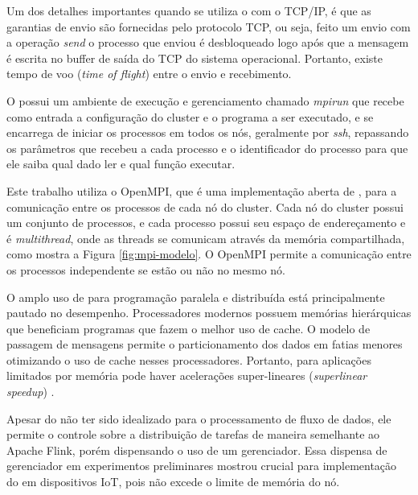 Um dos detalhes importantes quando se utiliza o \mpi com o TCP/IP, é que as
garantias de envio são fornecidas pelo protocolo TCP, ou seja, feito um envio
com a operação \emph{send} o processo que enviou é desbloqueado logo após que a
mensagem é escrita no buffer de saída do TCP do sistema operacional. Portanto,
existe tempo de voo (\emph{time of flight}) entre o envio e recebimento.

O \mpi possui um ambiente de execução e gerenciamento chamado \emph{mpirun} que
recebe como entrada a configuração do cluster e o programa a ser executado, e se
encarrega de iniciar os processos em todos os nós, geralmente por \emph{ssh},
repassando os parâmetros que recebeu a cada processo e o identificador do
processo para que ele saiba qual dado ler e qual função executar.

Este trabalho utiliza o OpenMPI, que é uma implementação aberta de \mpi, para a
comunicação entre os processos de cada nó do cluster. Cada nó do cluster possui um
conjunto de processos, e cada processo possui seu espaço de endereçamento e é
\emph{multithread}, onde as threads se comunicam através da memória
compartilhada, como mostra a Figura \ref{fig:mpi-modelo}. O OpenMPI permite a
comunicação entre os processos independente se estão ou não no mesmo nó.


O amplo uso de \mpi para programação paralela e distribuída está principalmente pautado no
desempenho. Processadores modernos possuem memórias hierárquicas que beneficiam
programas que fazem o melhor uso de cache. O modelo de passagem de mensagens
permite o particionamento dos dados em fatias menores otimizando o uso de cache
nesses processadores. Portanto, para aplicações limitados por memória pode haver
acelerações super-lineares (\emph{superlinear speedup}) \cite{mpi-book}.

Apesar do \mpi não ter sido idealizado para o processamento de fluxo de dados, ele
permite o controle sobre a distribuição de tarefas de maneira
semelhante ao Apache Flink, porém dispensando o uso de um
gerenciador. Essa dispensa de gerenciador em experimentos preliminares mostrou
crucial para implementação do \mfog em dispositivos IoT, pois não excede o limite de
memória do nó.

